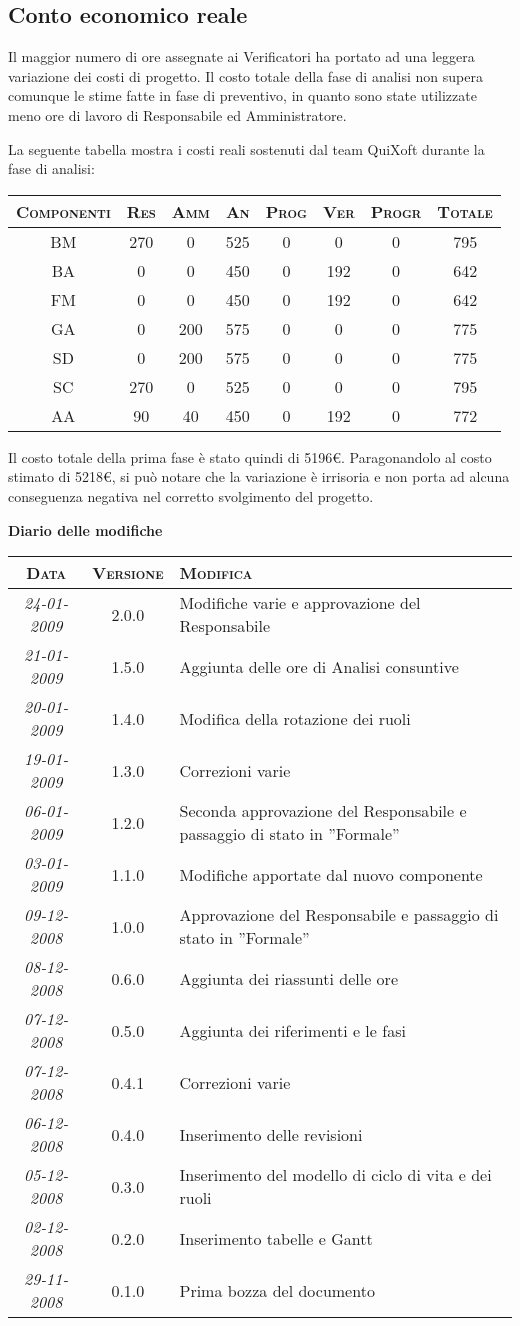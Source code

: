 \documentclass[11pt,a4paper]{article}
\newcommand{\modifiche} 
{
\newpage
\begin{center}
\textbf{Diario delle modifiche} \\
\bigskip
\begin{tabular}{|c|c|p{0.62\textwidth}|}
\hline
\textsc{Data} & \textsc{Versione} & \textsc{Modifica} \\
\hline
\hline
\textit{24-01-2009} & 2.0.0 & Modifiche varie e approvazione del Responsabile\\
\hline
\textit{21-01-2009} & 1.5.0 & Aggiunta delle ore di Analisi consuntive\\
\hline
\textit{20-01-2009} & 1.4.0 & Modifica della rotazione dei ruoli\\
\hline
\textit{19-01-2009} & 1.3.0 & Correzioni varie\\
\hline
\textit{06-01-2009} & 1.2.0 & Seconda approvazione del Responsabile e passaggio di stato in ''Formale''\\
\hline
\textit{03-01-2009} & 1.1.0 & Modifiche apportate dal nuovo componente\\
\hline
\textit{09-12-2008} & 1.0.0 & Approvazione del Responsabile e passaggio di stato in ''Formale''\\
\hline
\textit{08-12-2008} & 0.6.0 & Aggiunta dei riassunti delle ore \\
\hline
\textit{07-12-2008} & 0.5.0 & Aggiunta dei riferimenti e le fasi \\
\hline
\textit{07-12-2008} & 0.4.1 & Correzioni varie \\
\hline
\textit{06-12-2008} & 0.4.0 & Inserimento delle revisioni \\
\hline
\textit{05-12-2008} & 0.3.0 & Inserimento del modello di ciclo di vita e dei ruoli \\
\hline
\textit{02-12-2008} & 0.2.0 & Inserimento tabelle e Gantt \\
\hline
\textit{29-11-2008} & 0.1.0 & Prima bozza del documento \\
\hline
\end{tabular}
\end{center}
}
\begin{document}
\subsection{Conto economico reale}
Il maggior numero di ore assegnate ai Verificatori ha portato ad una leggera variazione dei costi di progetto.
Il costo totale della fase di analisi non supera comunque le stime fatte in fase di preventivo, in quanto sono state utilizzate meno ore di lavoro di Responsabile ed Amministratore.

La seguente tabella mostra i costi reali sostenuti dal team QuiXoft durante la fase di analisi:
\\
\begin{center}
\begin{tabular}{|c||c|c|c|c|c|c||c|}
\hline
\textsc{Componenti} & \textsc{Res} & \textsc{Amm} & \textsc{An} & \textsc{Prog} & \textsc{Ver} & \textsc{Progr} & \textsc{Totale}\\
\hline \hline
BM & 270 & 0 & 525 & 0 & 0 & 0 & 795 \\ \hline
BA & 0 & 0 & 450 & 0 & 192 & 0 & 642 \\ \hline
FM & 0 & 0 & 450 & 0 & 192 & 0 & 642 \\ \hline
GA & 0 & 200 & 575 & 0 & 0 & 0 & 775 \\ \hline
SD & 0 & 200 & 575 & 0 & 0 & 0 & 775 \\ \hline
SC & 270 & 0 & 525 & 0 & 0 & 0 & 795 \\ \hline
AA & 90 & 40 & 450 & 0 & 192 & 0 & 772 \\ \hline
\end{tabular}
\end{center}
\bigskip
Il costo totale della prima fase è stato quindi di 5196\euro. Paragonandolo al costo stimato di 5218\euro, si può notare che la variazione è irrisoria e non porta ad alcuna conseguenza negativa nel corretto svolgimento del progetto.
\modifiche
\end{document}
